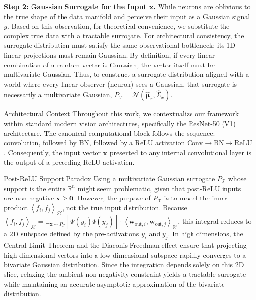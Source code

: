 \documentclass[11pt, a4paper, copyright, gdm]{google}
\newcommand{\inner}[2]{\left\langle#1, #2\right\rangle}
\newcommand{\wVect}{\boldsymbol{w}}
\newcommand{\xVect}{\boldsymbol{x}}
\newcommand{\zeroVect}{\boldsymbol{0}}
\newcommand{\muVect}{\boldsymbol{\mu}}
\newcommand{\calH}{\mathcal{H}}
\newcommand{\calN}{\mathcal{N}}
\newcommand{\calX}{\mathcal{X}}
\newcommand{\R}{\mathbb{R}}
\newcommand{\E}{\mathbb{E}}
\theoremstyle{definition}
\begin{document}
\noindent \textbf{Step 2: Gaussian Surrogate for the Input $\xVect$.}
While neurons are oblivious to the true shape of the data manifold and perceive their input as a Gaussian signal $y$. Based on this observation, for theoretical convenience, we substitute the complex true data with a tractable surrogate. For architectural consistency, the surrogate distribution must satisfy the same observational bottleneck: its 1D linear projections must remain Gaussian. By definition, if every linear combination of a random vector is Gaussian, the vector itself must be multivariate Gaussian. Thus, to construct a surrogate distribution aligned with a world where every linear observer (neuron) sees a Gaussian, that surrogate is necessarily a multivariate Gaussian, $P_{\calX} = \calN(\hat{\muVect}_x, \hat{\Sigma}_x)$. 

\begin{alertbox}{Architectural Context}
Throughout this work, we contextualize our framework within standard modern vision architectures, specifically the ResNet-50 (V1) architecture. The canonical computational block follows the sequence: convolution, followed by BN, followed by a ReLU activation $\text{Conv} \to \text{BN} \to \text{ReLU}$. Consequently, the input vector $\xVect$ presented to any internal convolutional layer is the output of a preceding ReLU activation.
\end{alertbox}

\begin{insight}{Post-ReLU Support Paradox}
Using a multivariate Gaussian surrogate $P_{\calX}$ whose support is the entire $\R^n$ might seem problematic, given that post-ReLU inputs are non-negative $\xVect \ge \zeroVect$. However, the purpose of $P_{\calX}$ is to model the inner product $\inner{f_i}{f_j}_{\calH}$, not the true input distribution. Because $\inner{f_i}{f_j}_{\calH} = \E_{\xVect \sim P_{\calX}} [\Psi(y_i) \Psi(y_j)] \cdot \inner{\wVect_{\text{out},i}}{\wVect_{\text{out},j}}_{\R^c}$, this integral reduces to a 2D subspace defined by the pre-activations $y_i$ and $y_j$. In high dimensions, the Central Limit Theorem and the Diaconis-Freedman effect ensure that projecting high-dimensional vectors into a low-dimensional subspace rapidly converges to a bivariate Gaussian distribution. Since the integration depends solely on this 2D slice, relaxing the ambient non-negativity constraint yields a tractable surrogate while maintaining an accurate asymptotic approximation of the bivariate distribution.
\end{insight}
\end{document}

